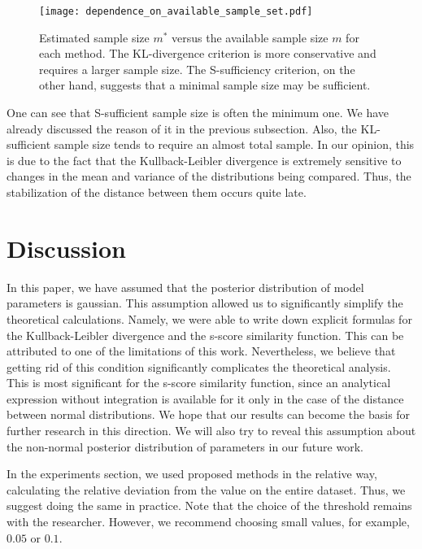 \documentclass[sn-mathphys-num]{sn-jnl}%
\begin{document}
\begin{figure}[ht]
    \centering
    \texttt{[image: dependence\_on\_available\_sample\_set.pdf]}
    \caption{Estimated sample size $m^*$ versus the available sample size $m$ for each method. The KL-divergence criterion is more conservative and requires a larger sample size. The S-sufficiency criterion, on the other hand, suggests that a minimal sample size may be sufficient.}
    \label{dependence_on_available_sample_set}
\end{figure}

One can see that S-sufficient sample size is often the minimum one. We have already discussed the reason of it in the previous subsection. Also, the KL-sufficient sample size tends to require an almost total sample. In our opinion, this is due to the fact that the Kullback-Leibler divergence is extremely sensitive to changes in the mean and variance of the distributions being compared. Thus, the stabilization of the distance between them occurs quite late.

\section{Discussion}

In this paper, we have assumed that the posterior distribution of model parameters is gaussian. This assumption allowed us to significantly simplify the theoretical calculations. Namely, we were able to write down explicit formulas for the Kullback-Leibler divergence and the s-score similarity function. This can be attributed to one of the limitations of this work. Nevertheless, we believe that getting rid of this condition significantly complicates the theoretical analysis. This is most significant for the s-score similarity function, since an analytical expression without integration is available for it only in the case of the distance between normal distributions. We hope that our results can become the basis for further research in this direction. We will also try to reveal this assumption about the non-normal posterior distribution of parameters in our future work.

In the experiments section, we used proposed methods in the relative way, calculating the relative deviation from the value on the entire dataset. Thus, we suggest doing the same in practice. Note that the choice of the threshold remains with the researcher. However, we recommend choosing small values, for example, $0.05$ or $0.1$.
\end{document}
